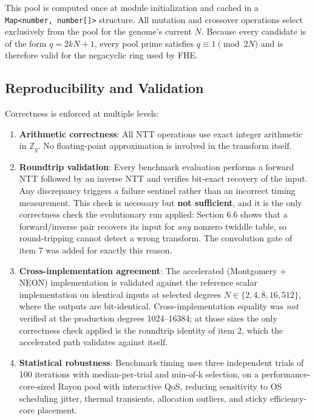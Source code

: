 This pool is computed once at module initialization and cached in a \texttt{Map\textless{}number,\ number{[}{]}\textgreater{}} structure. All mutation and crossover operations select exclusively from the pool for the genome's current \(N\). Because every candidate is of the form \(q = 2kN + 1\), every pool prime satisfies \(q \equiv 1 \pmod{2N}\) and is therefore valid for the negacyclic ring used by FHE.

\subsection{Reproducibility and Validation}\label{reproducibility-and-validation}

Correctness is enforced at multiple levels:

\begin{enumerate}
\def\labelenumi{\arabic{enumi}.}
\tightlist
\item
  \textbf{Arithmetic correctness}: All NTT operations use exact integer arithmetic in \(\mathbb{Z}_q\). No floating-point approximation is involved in the transform itself.
\item
  \textbf{Roundtrip validation}: Every benchmark evaluation performs a forward NTT followed by an inverse NTT and verifies bit-exact recovery of the input. Any discrepancy triggers a failure sentinel rather than an incorrect timing measurement. This check is necessary but \textbf{not sufficient}, and it is the only correctness check the evolutionary run applied: Section 6.6 shows that a forward/inverse pair recovers its input for \emph{any} nonzero twiddle table, so round-tripping cannot detect a wrong transform. The convolution gate of item 7 was added for exactly this reason.
\item
  \textbf{Cross-implementation agreement}: The accelerated (Montgomery + NEON) implementation is validated against the reference scalar implementation on identical inputs at selected degrees \(N \in \{2, 4, 8, 16, 512\}\), where the outputs are bit-identical. Cross-implementation equality was \emph{not} verified at the production degrees 1024--16384; at those sizes the only correctness check applied is the roundtrip identity of item 2, which the accelerated path validates against itself.
\item
  \textbf{Statistical robustness}: Benchmark timing uses three independent trials of 100 iterations with median-per-trial and min-of-k selection, on a performance-core-sized Rayon pool with interactive QoS, reducing sensitivity to OS scheduling jitter, thermal transients, allocation outliers, and sticky efficiency-core placement.

\end{enumerate}
